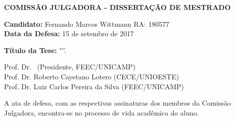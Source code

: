 \newpage

\begin{center}
  \large{\textbf{COMISSÃO JULGADORA - DISSERTAÇÃO DE MESTRADO}}
\end{center}


{\setlength{\parindent}{0cm}

\vspace{2cm}


\textbf{Candidato:} Fernando Marcos Wittmann RA: 180577 \\
\textbf{Data da Defesa:} 15 de setembro de 2017

\vspace{2cm}

\textbf{Título da Tese:} "\titulobr”.

\vspace{3cm}

Prof. Dr. \orientador \ (Presidente, FEEC/UNICAMP)\\
Prof. Dr. Roberto Cayetano Lotero (CECE/UNIOESTE)\\
Prof. Dr. Luiz Carlos Pereira da Silva (FEEC/UNICAMP)\\

\vspace{3cm}

 A ata de defesa, com as respectivas assinaturas dos membros da Comissão Julgadora, encontra-se no processo de vida acadêmica do aluno.
 
}